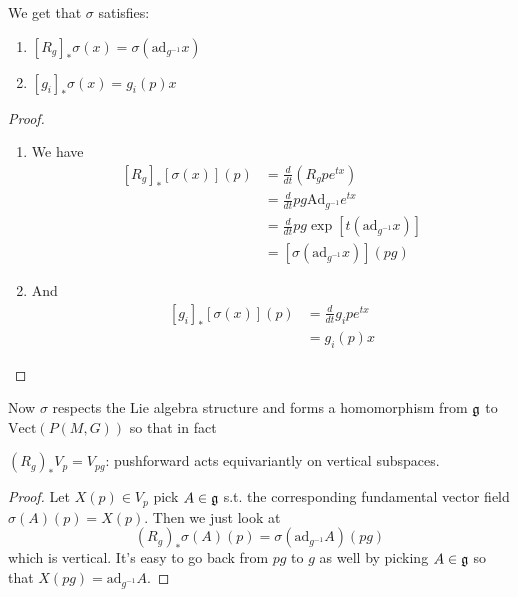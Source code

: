 		\begin{lemma}
			We get that $\sigma$ satisfies:
			\begin{enumerate}
				\item $[R_{g}]_* \sigma(x) = \sigma(\text{ad}_{g^{-1}} x)$
				\item $[g_i]_* \sigma(x) = g_i(p) x$
			\end{enumerate}
		\end{lemma}
		\begin{proof}
			\begin{enumerate}
				\item We have
				\begin{equation}
					\begin{aligned}
						\left[ R_{g} \right]_* [\sigma(x)](p)  &= \frac{d}{dt} (R_g p e^{tx}) \\
						& = \frac{d}{dt} p g \text{Ad}_{g^{-1}} e^{tx}\\ 
						& = \frac{d}{dt} p g \exp[ t (\text{ad}_{g^{-1}} x) ]\\
						& = [\sigma(\text{ad}_{g^{-1}} x)] (pg)
					\end{aligned}
				\end{equation}
				\item And
				\begin{equation}
					\begin{aligned}
						\left[g_i\right]_* [\sigma(x)](p) &= \frac{d}{dt} g_i p e^{t x}\\
											&= g_i(p) x
					\end{aligned}
				\end{equation}
			\end{enumerate}
		\end{proof}
	
		Now $\sigma$ respects the Lie algebra structure and forms a homomorphism from $\frak g$ to $\text{Vect}(P(M,G))$ so that in fact
		\begin{cor}\label{cor:verticalequiv}
			$(R_g)_* V_p = V_{pg}$: pushforward acts equivariantly on vertical subspaces.
		\end{cor}
		\begin{proof}
			Let $X(p) \in V_p$ pick $A \in \frak g$ s.t. the corresponding fundamental vector field $\sigma(A) (p) = X(p)$. Then we just look at
			\begin{equation}
				(R_g)_* \sigma(A) (p) = \sigma(\mathrm{ad}_{g^{-1}} A)(pg)
			\end{equation} 
			which is vertical. It's easy to go back from $pg$ to $g$ as well by picking $A \in \frak g$ so that $X(pg) = \mathrm{ad}_{g^{-1}} A$.
		\end{proof}
	
